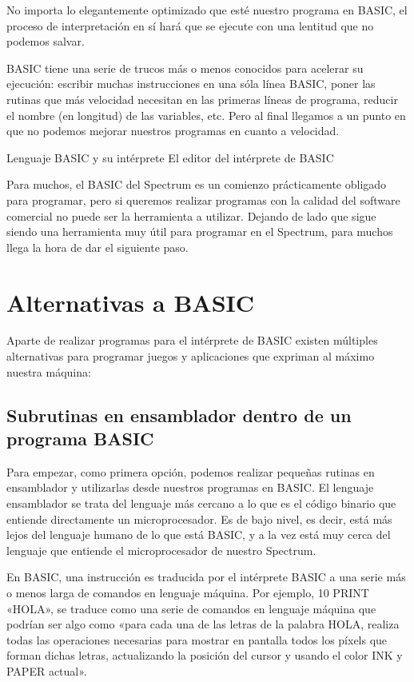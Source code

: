 \documentclass[letterpaper,10pt,spanish]{sphinxmanual}
\begin{document}
No importa lo elegantemente optimizado que esté nuestro programa en BASIC, el proceso de interpretación en sí hará que se ejecute con una lentitud que no podemos salvar.

BASIC tiene una serie de trucos más o menos conocidos para acelerar su ejecución: escribir muchas instrucciones en una sóla línea BASIC, poner las rutinas que más velocidad necesitan en las primeras líneas de programa, reducir el nombre (en longitud) de las variables, etc. Pero al final llegamos a un punto en que no podemos mejorar nuestros programas en cuanto a velocidad.

Lenguaje BASIC y su intérprete
El editor del intérprete de BASIC

Para muchos, el BASIC del Spectrum es un comienzo prácticamente obligado para programar, pero si queremos realizar programas con la calidad del software comercial no puede ser la herramienta a utilizar. Dejando de lado que sigue siendo una herramienta muy útil para programar en el Spectrum, para muchos llega la hora de dar el siguiente paso.


\chapter{Alternativas a BASIC}
\label{\detokenize{02_introduccion/introduccion:alternativas-a-basic}}
Aparte de realizar programas para el intérprete de BASIC existen múltiples alternativas para programar juegos y aplicaciones que expriman al máximo nuestra máquina:


\section{Subrutinas en ensamblador dentro de un programa BASIC}
\label{\detokenize{02_introduccion/introduccion:subrutinas-en-ensamblador-dentro-de-un-programa-basic}}
Para empezar, como primera opción, podemos realizar pequeñas rutinas en ensamblador y utilizarlas desde nuestros programas en BASIC. El lenguaje ensamblador se trata del lenguaje más cercano a lo que es el código binario que entiende directamente un microprocesador. Es de bajo nivel, es decir, está más lejos del lenguaje humano de lo que está BASIC, y a la vez está muy cerca del lenguaje que entiende el microprocesador de nuestro Spectrum.

En BASIC, una instrucción es traducida por el intérprete BASIC a una serie más o menos larga de comandos en lenguaje máquina. Por ejemplo, 10 PRINT «HOLA», se traduce como una serie de comandos en lenguaje máquina que podrían ser algo como «para cada una de las letras de la palabra HOLA, realiza todas las operaciones necesarias para mostrar en pantalla todos los píxels que forman dichas letras, actualizando la posición del cursor y usando el color INK y PAPER actual».
\end{document}
